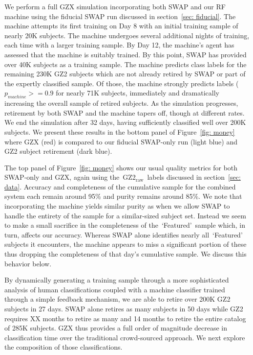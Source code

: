 \documentclass[twocolumn]{aastex6}
\newcommand{\feat}{`Featured'}
\newcommand{\raw}{GZ2$_{\text{raw}}$}
\begin{document}
We perform a full GZX simulation incorporating both SWAP and our RF machine using the
 fiducial SWAP run discussed in section~\ref{sec: fiducial}. 
The machine attempts its first training on Day 8 with an initial training
sample of nearly 20K subjects.  The machine undergoes several additional nights of training, 
each time with a larger training sample. 
By Day 12, the machine's agent has assessed that the machine is suitably trained. 
By this point, SWAP has provided over 40K subjects as a training sample. 
The machine predicts class labels for the remaining 230K GZ2 subjects which are not 
already retired by SWAP or part of the expertly classified sample. 
Of those, the machine strongly predicts labels ($p_{machine} >= 0.9$ for nearly 71K subjects,  immediately and dramatically increasing the overall sample of retired subjects. 
As the simulation progresses, retirement by both SWAP and
the machine tapers off, though at different rates. 
We end the simulation after 32 days, having sufficiently classified well over 200K subjects. 
We present these results in the bottom panel of Figure~\ref{fig: money} where GZX (red) 
is compared to our fiducial SWAP-only run (light blue) and GZ2 subject retirement (dark blue). 


The top panel of Figure~\ref{fig: money} shows our usual quality metrics for both 
SWAP-only and GZX, again using the~\raw~labels discussed in section~\ref{sec: data}.
Accuracy and completeness of the cumulative sample for the combined system 
each remain around 95\% and purity remains around 85\%. We note that 
incorporating the machine yields similar purity as when we 
allow SWAP to handle the entirety of the sample for a similar-sized subject set. 
Instead we seem to make a small sacrifice in the completeness of the~\feat~sample
which, in turn, affects our accuracy. Whereas SWAP alone identifies nearly all~\feat~
subjects it encounters,  the machine appears to miss a significant 
portion of these thus dropping the completeness of that day's 
cumulative sample. We discuss this behavior below.

By dynamically generating a training sample
through a more sophisticated analysis of human classifications coupled with a 
machine classifier trained through a simple feedback mechanism, we are able to 
retire over 200K GZ2 subjects in 27 days.  SWAP alone retires as many subjects in 50 days
while GZ2 requires XX months to retire as many and 14 months to retire 
the entire catalog of 285K subjects. 
GZX thus provides a full order of magnitude decrease in classification time
over the traditional crowd-sourced approach. 
We next explore the composition of those classifications.
\end{document}
